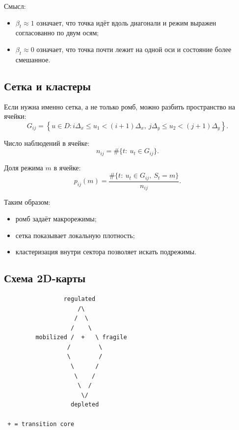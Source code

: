 \documentclass[12pt,a4paper]{article}
\begin{document}
Смысл:
\begin{itemize}[leftmargin=1.25cm]
    \item $\beta_t \approx 1$ означает, что точка идёт вдоль диагонали и режим выражен согласованно по двум осям;
    \item $\beta_t \approx 0$ означает, что точка почти лежит на одной оси и состояние более смешанное.
\end{itemize}

\subsection{Сетка и кластеры}
Если нужна именно сетка, а не только ромб, можно разбить пространство на ячейки:
\begin{equation}
G_{ij}=
\left\{
u\in D:
i\Delta_x \le u_1 < (i+1)\Delta_x,\ 
j\Delta_y \le u_2 < (j+1)\Delta_y
\right\}.
\end{equation}

Число наблюдений в ячейке:
\begin{equation}
n_{ij} = \#\{t:\ u_t\in G_{ij}\}.
\end{equation}

Доля режима $m$ в ячейке:
\begin{equation}
p_{ij}(m)=
\frac{\#\{t:\ u_t\in G_{ij},\ S_t=m\}}
{n_{ij}}.
\end{equation}

Таким образом:
\begin{itemize}[leftmargin=1.25cm]
    \item ромб задаёт макрорежимы;
    \item сетка показывает локальную плотность;
    \item кластеризация внутри сектора позволяет искать подрежимы.
\end{itemize}

\subsection{Схема 2D-карты}
\begin{verbatim}
                 regulated
                     /\
                    /  \
                   /    \
         mobilized /  +   \ fragile
                  /        \
                  \        /
                   \      /
                    \    /
                     \  /
                      \/
                   depleted

 + = transition core
\end{verbatim}
\end{document}

